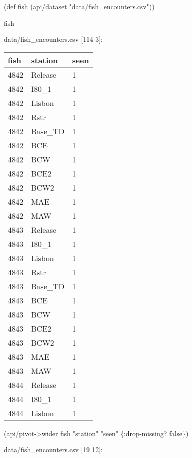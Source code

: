 \documentclass[]{article}
\newenvironment{Shaded}{\begin{snugshade}}{\end{snugshade}}
\newcommand{\AttributeTok}[1]{\textcolor[rgb]{0.77,0.63,0.00}{#1}}
\newcommand{\BuiltInTok}[1]{#1}
\newcommand{\FunctionTok}[1]{\textcolor[rgb]{0.00,0.00,0.00}{#1}}
\newcommand{\NormalTok}[1]{#1}
\newcommand{\StringTok}[1]{\textcolor[rgb]{0.31,0.60,0.02}{#1}}
\newcommand{\VariableTok}[1]{\textcolor[rgb]{0.00,0.00,0.00}{#1}}
\begin{document}
\begin{Shaded}
\begin{Highlighting}[]
\NormalTok{(}\BuiltInTok{def}\FunctionTok{ fish }\NormalTok{(api/dataset }\StringTok{"data/fish_encounters.csv"}\NormalTok{))}
\end{Highlighting}
\end{Shaded}

\begin{Shaded}
\begin{Highlighting}[]
\NormalTok{fish}
\end{Highlighting}
\end{Shaded}

data/fish\_encounters.csv {[}114 3{]}:

\begin{longtable}[]{@{}lll@{}}
\toprule
fish & station & seen\tabularnewline
\midrule
\endhead
4842 & Release & 1\tabularnewline
4842 & I80\_1 & 1\tabularnewline
4842 & Lisbon & 1\tabularnewline
4842 & Rstr & 1\tabularnewline
4842 & Base\_TD & 1\tabularnewline
4842 & BCE & 1\tabularnewline
4842 & BCW & 1\tabularnewline
4842 & BCE2 & 1\tabularnewline
4842 & BCW2 & 1\tabularnewline
4842 & MAE & 1\tabularnewline
4842 & MAW & 1\tabularnewline
4843 & Release & 1\tabularnewline
4843 & I80\_1 & 1\tabularnewline
4843 & Lisbon & 1\tabularnewline
4843 & Rstr & 1\tabularnewline
4843 & Base\_TD & 1\tabularnewline
4843 & BCE & 1\tabularnewline
4843 & BCW & 1\tabularnewline
4843 & BCE2 & 1\tabularnewline
4843 & BCW2 & 1\tabularnewline
4843 & MAE & 1\tabularnewline
4843 & MAW & 1\tabularnewline
4844 & Release & 1\tabularnewline
4844 & I80\_1 & 1\tabularnewline
4844 & Lisbon & 1\tabularnewline
\bottomrule
\end{longtable}

\begin{Shaded}
\begin{Highlighting}[]
\NormalTok{(api/pivot->wider fish }\StringTok{"station"} \StringTok{"seen"}\NormalTok{ \{}\AttributeTok{:drop-missing}\NormalTok{? }\VariableTok{false}\NormalTok{\})}
\end{Highlighting}
\end{Shaded}

data/fish\_encounters.csv {[}19 12{]}:
\end{document}

